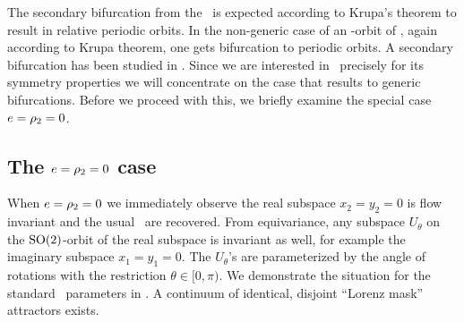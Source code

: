 The secondary bifurcation from the \reqv\ is expected according
to Krupa's theorem to result in
relative periodic orbits. In the non-generic case of an
-orbit of \eqva, again according to
Krupa theorem, one gets bifurcation
to periodic orbits. A secondary bifurcation has been
studied in .
Since we are interested in \CLe\
precisely for its symmetry properties we will concentrate on the
case that results to generic bifurcations. Before we proceed
with this, we briefly examine the special case $e=\rho_2=0$.


\subsection{The $e=\rho_2=0$ case}

When $e=\rho_2=0$ we immediately observe the real subspace $x_2=y_2=0$ is flow invariant
and the usual \Le\ are recovered. From equivariance, any subspace $U_\theta$ on the $\mathrm{SO}(2)$-orbit of the real
subspace is invariant as well, for example the imaginary subspace $x_1=y_1=0$. The
$U_\theta$'s are  parameterized by the angle of \SOn{2} rotations with
the restriction $\theta\in[0,\pi)$. We demonstrate the situation for the standard \Le\ parameters
in \reffig{fig:LorenzCoex}. A continuum of identical, disjoint ``Lorenz mask'' attractors exists.

